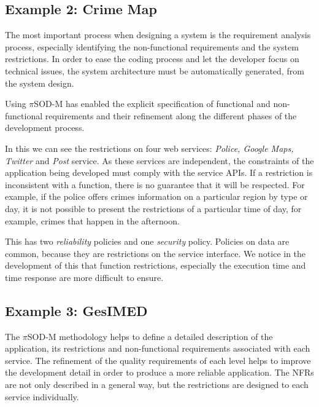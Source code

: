 \subsection{Example 2: Crime Map}

The most important process when designing a system is the requirement analysis
process, especially identifying the non-functional requirements and the system
restrictions. In order to ease the coding process and let the developer focus on
technical issues, the system architecture must be automatically generated, from
the system design.

Using $\pi$SOD-M has enabled the explicit specification of functional and
non-functional requirements and their refinement along the different phases of
the development process.


In this  we can see the restrictions on four web services:
\textit{Police, Google Maps, Twitter} and \textit{Post} service. As these
services are independent, the constraints of the application being developed
must comply with the service APIs. If a restriction is inconsistent with a
function, there is no guarantee that it will be respected. For example, if the police offers crimes information on a
particular region by type or day, it is not possible to present the restrictions
of a particular time of day, for example, crimes that happen in the afternoon.

This  has two \textit{reliability} policies and one \textit{security}
policy. Policies on data are common, because they are restrictions on
the service interface. We notice in the development of this  that
function restrictions, especially the execution time and time
response are more difficult to ensure.    

\subsection{Example 3: GesIMED}

 
The $\pi$SOD-M methodology helps to define a detailed description of the
application, its restrictions and non-functional requirements associated with each service.
The refinement of the quality requirements of each level helps to improve the
development detail in order to produce a more reliable application. The NFRs are
not only described in a general way, but the restrictions are designed to each
service individually.

